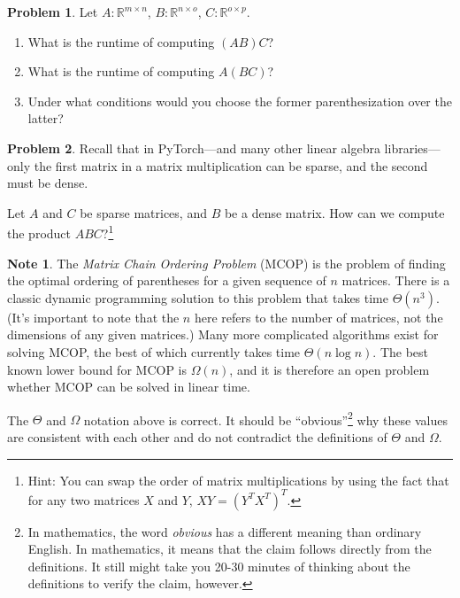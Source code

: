\documentclass[10pt]{article}
\theoremstyle{definition}
\newtheorem{problem}{Problem}
\newtheorem{note}{Note}
\newcommand{\R}{\mathbb R}
\newcommand{\trans}[1]{{#1}^{T}}
\begin{document}
\begin{problem}
    Let $A : \R^{m\times n}$, $B : \R^{n\times o}$, $C : \R^{o\times p}$.

    \begin{enumerate}
        \item What is the runtime of computing $(AB)C$?
            \vspace{2in}
        \item What is the runtime of computing $A(BC)$?
            \vspace{2in}
        \item Under what conditions would you choose the former parenthesization over the latter?
            \vspace{2in}
    \end{enumerate}
\end{problem}

\newpage

\begin{problem}
Recall that in PyTorch---and many other linear algebra libraries---only the first matrix in a matrix multiplication can be sparse,
and the second must be dense.

Let $A$ and $C$ be sparse matrices, and $B$ be a dense matrix.
How can we compute the product $ABC$?\footnote{
Hint: You can swap the order of matrix multiplications by using the fact that for any two matrices $X$ and $Y$, $XY = \trans{(\trans Y \trans X)}$.
    }
\end{problem}

\newpage
\begin{note}
The \emph{Matrix Chain Ordering Problem} (MCOP) is the problem of finding the optimal ordering of parentheses for a given sequence of $n$ matrices.
There is a classic dynamic programming solution to this problem that takes time $\Theta(n^3)$.
(It's important to note that the $n$ here refers to the number of matrices, not the dimensions of any given matrices.)
Many more complicated algorithms exist for solving MCOP,
the best of which currently takes time $\Theta(n \log n)$.
The best known lower bound for MCOP is $\Omega(n)$,
and it is therefore an open problem whether MCOP can be solved in linear time.

The $\Theta$ and $\Omega$ notation above is correct.
It should be ``obvious''\footnote{In mathematics, the word \emph{obvious} has a different meaning than ordinary English.  In mathematics, it means that the claim follows directly from the definitions.  It still might take you 20-30 minutes of thinking about the definitions to verify the claim, however.} why these values are consistent with each other and do not contradict the definitions of $\Theta$ and $\Omega$.
\end{note}
\end{document}
